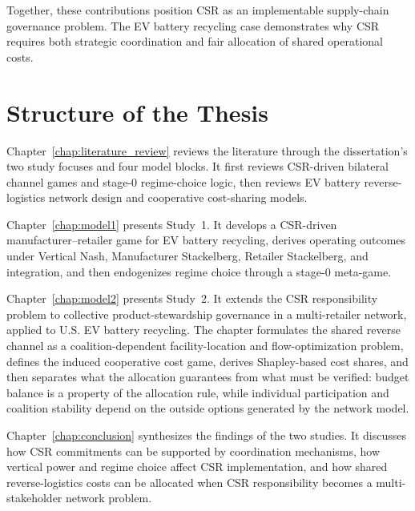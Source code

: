 Together, these contributions position CSR as an implementable supply-chain governance problem. The EV battery recycling case demonstrates why CSR requires both strategic coordination and fair allocation of shared operational costs.

\section{Structure of the Thesis}
\label{sec:intro_structure}

Chapter~\ref{chap:literature_review} reviews the literature through the dissertation's two study focuses and four model blocks. It first reviews CSR-driven bilateral channel games and stage-0 regime-choice logic, then reviews EV battery reverse-logistics network design and cooperative cost-sharing models.

Chapter~\ref{chap:model1} presents Study~1. It develops a CSR-driven manufacturer--retailer game for EV battery recycling, derives operating outcomes under Vertical Nash, Manufacturer Stackelberg, Retailer Stackelberg, and integration, and then endogenizes regime choice through a stage-0 meta-game.

Chapter~\ref{chap:model2} presents Study~2. It extends the CSR responsibility problem to collective product-stewardship governance in a multi-retailer network, applied to U.S. EV battery recycling. The chapter formulates the shared reverse channel as a coalition-dependent facility-location and flow-optimization problem, defines the induced cooperative cost game, derives Shapley-based cost shares, and then separates what the allocation guarantees from what must be verified: budget balance is a property of the allocation rule, while individual participation and coalition stability depend on the outside options generated by the network model.

Chapter~\ref{chap:conclusion} synthesizes the findings of the two studies. It discusses how CSR commitments can be supported by coordination mechanisms, how vertical power and regime choice affect CSR implementation, and how shared reverse-logistics costs can be allocated when CSR responsibility becomes a multi-stakeholder network problem.
